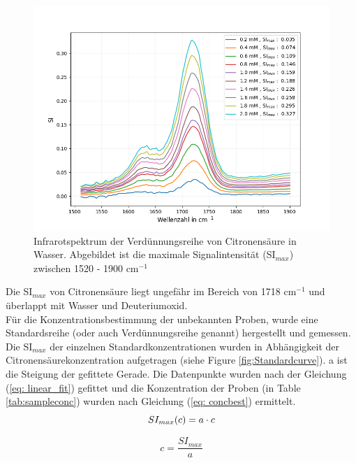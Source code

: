\documentclass[10pt,a4paper]{article}
\begin{document}
			\begin{figure}[H]
				\centering
				\includegraphics[scale=0.55]{Standardcurve_citricacid.png}
				\caption{Infrarotspektrum der Verdünnungsreihe von Citronensäure in Wasser. Abgebildet ist die maximale Signalintensität (SI$_{max}$) zwischen 1520 - 1900 cm$^{-1}$}
				\label{fig:IR_Standardcurve}
			\end{figure}
			
			Die SI$_{max}$ von Citronensäure liegt ungefähr im Bereich von 1718 cm$^{-1}$ und überlappt mit Wasser und Deuteriumoxid.\\

			Für die Konzentrationsbestimmung der unbekannten Proben, wurde eine Standardsreihe (oder auch Verdünnungsreihe genannt) hergestellt und gemessen.\\
			Die SI$_{max}$  der einzelnen Standardkonzentrationen wurden in Abhängigkeit der Citronensäurekonzentration aufgetragen (siehe Figure \ref{fig:Standardcurve}). a ist die Steigung der gefittete Gerade. Die Datenpunkte wurden nach der Gleichung (\ref{eq: linear_fit}) gefittet und die Konzentration der Proben (in Table \ref{tab:sampleconc}) wurden nach Gleichung (\ref{eq: concbest}) ermittelt.\\

			\begin{equation}\label{eq: linear_fit}
				SI_{max} (c)= a \cdot c\\
			\end{equation}
			
			\begin{equation}\label{eq: concbest}
				c = \frac{SI_{max}}{a}
			\end{equation}
			
\end{document}
